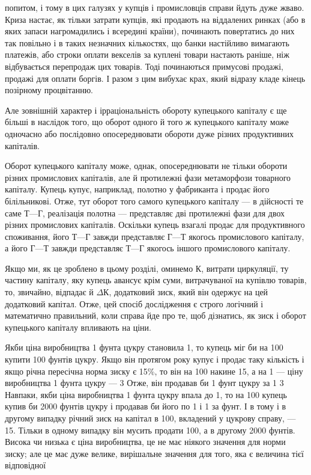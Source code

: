 \parcont{}  %
попитом, і тому в цих галузях у купців і промисловців справи
йдуть дуже жваво. Криза настає, як тільки затрати купців, які
продають на віддалених ринках (або в яких запаси нагромадились
і всередині країни), починають повертатись до них так
повільно і в таких незначних кількостях, що банки настійливо
вимагають платежів, або строки оплати векселів за куплені
товари настають раніше, ніж відбувається перепродаж цих
товарів. Тоді починаються примусові продажі, продажі для
оплати боргів. І разом з цим вибухає крах, який відразу кладе
кінець позірному процвітанню.

Але зовнішній характер і ірраціональність обороту купецького
капіталу є ще більші в наслідок того, що оборот одного й того ж
купецького капіталу може одночасно або послідовно опосереднювати
обороти дуже різних продуктивних капіталів.

Оборот купецького капіталу може, однак, опосереднювати
не тільки обороти різних промислових капіталів, але й протилежні
фази метаморфози товарного капіталу. Купець купує,
наприклад, полотно у фабриканта і продає його білільникові.
Отже, тут оборот того самого купецького капіталу — в дійсності
те саме $Т — Г$, реалізація полотна — представляє дві протилежні
фази для двох різних промислових капіталів. Оскільки
купець взагалі продає для продуктивного споживання, його
$Т — Г$ завжди представляє $Г — Т$ якогось промислового капіталу,
а його $Г — Т$ завжди представляє $Т — Г$ якогось іншого промислового
капіталу.

Якщо ми, як це зроблено в цьому розділі, оминемо $К$, витрати
циркуляції, ту частину капіталу, яку купець авансує крім
суми, витрачуваної на купівлю товарів, то, звичайно, відпадає
й $ΔК$, додатковий зиск, який він одержує на цей додатковий
капітал. Отже, цей спосіб дослідження є строго логічний і математично
правильний, коли справа йде про те, щоб дізнатись,
як зиск і оборот купецького капіталу впливають на ціни.

Якби ціна виробництва 1 фунта цукру становила 1, то купець міг би на 100 купити
100 фунтів цукру. Якщо він протягом року купує і продає таку
кількість і якщо річна пересічна норма зиску є 15\%, то він
на 100 накине 15, а на
1 — ціну виробництва 1 фунта цукру — 3
Отже, він продавав би 1 фунт цукру за 1 3
Навпаки, якби ціна виробництва 1 фунта цукру впала до
1, то на 100 купець купив би 2000 фунтів
цукру і продавав би його по 1 і 1 за фунт.
І в тому і в другому випадку річний зиск на капітал в 100, вкладений у цукрову справу, — 15.
Тільки в одному випадку він мусить продати 100, а в другому
2000 фунтів. Висока чи низька є ціна виробництва, це не має
ніякого значення для норми зиску; але це має дуже велике,
вирішальне значення для того, яка є величина тієї відповідної
\parbreak{}  %
